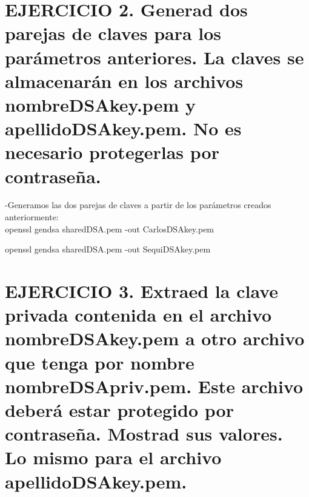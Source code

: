 







\section{EJERCICIO 2. Generad dos parejas de claves para los parámetros anteriores. La claves se almacenarán en los archivos nombreDSAkey.pem y apellidoDSAkey.pem. No es necesario protegerlas por contraseña. }

-Generamos las dos parejas de claves a partir de los parámetros creados anteriormente: \\

openssl gendsa sharedDSA.pem -out CarlosDSAkey.pem 

openssl gendsa sharedDSA.pem -out SequiDSAkey.pem 












\section{EJERCICIO 3. Extraed la clave privada contenida en el archivo nombreDSAkey.pem a otro archivo que tenga por nombre nombreDSApriv.pem. Este archivo deberá estar protegido por contraseña. Mostrad sus valores. Lo mismo para el archivo apellidoDSAkey.pem. }


